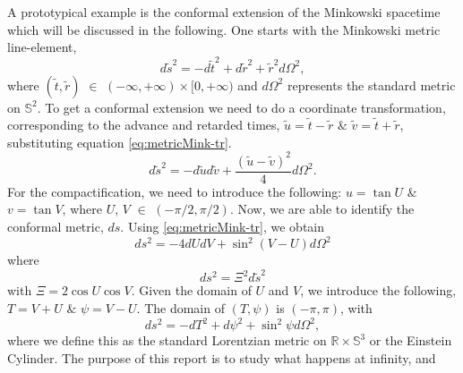 \documentclass[
11pt, %
english, %
singlespacing, %
headsepline, %
]{MastersDoctoralThesis} %
\begin{document}
A prototypical example is the conformal extension of the Minkowski
spacetime which will be discussed in the following.  One starts with
the Minkowski metric line-element,
\begin{equation}\label{eq:metricMink-tr}
	d \tilde{s}^2=-d \tilde{t}^2+d \tilde{r}^2+\tilde{r}^2 d
        \Omega^2,
\end{equation}
where $(\tilde{t}, \tilde{r})$ $\in$ $(-\infty,+\infty)
\times[0,+\infty)$ and $d \Omega^2$ represents the standard metric on
  $\mathbb{S}^2$. To get a conformal extension we need to do a
  coordinate transformation, corresponding to the advance and retarded  
  times, $\tilde{u}=\tilde{t}-\tilde{r}$ $\&$ $\tilde{v}=\tilde{t}+\tilde{r}$,
  substituting equation \eqref{eq:metricMink-tr}.
\begin{equation}\label{eq:metricMink-tr1}
	d \tilde{s}^2=-d \tilde{u} d \tilde{v}+\frac{(\tilde{u}-\tilde{v})^2}{4} d \Omega^2.
\end{equation}
For the compactification, we need to introduce the following: $u =
\tan U$ $\&$ $v = \tan V$, where $U$, $V$ $\in$ $(- \pi/2,
\pi/2)$. Now, we are able to identify the conformal metric,
$ds$. Using \eqref{eq:metricMink-tr}, we obtain
$$d s^2=-4 d U d V+\sin ^2(V-U) d \Omega^2$$ where
$$d s^2=\Xi^2 d \tilde{s}^2$$ with $\Xi=2 \cos U \cos V$. Given the
domain of $U$ and $V$, we introduce the following, $T=V+U$ $\&$
$\psi=V-U$. The domain of $(T, \psi)$ is $(-\pi, \pi)$, with
\begin{equation}\label{eq:metricMink-cf}
	d s^2=-d T^2+d \psi^2+\sin ^2 \psi d \Omega^2,
\end{equation}
where we define this as the standard Lorentzian metric on $\mathbb{R}
\times \mathbb{S}^3$ or the Einstein Cylinder.
The purpose of this report is to study what happens at infinity, and
\end{document}
